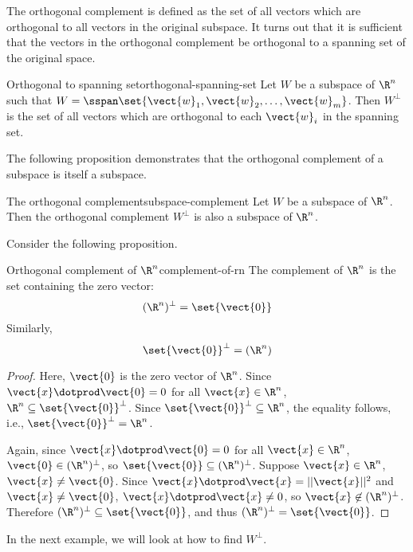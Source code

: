 The orthogonal complement is defined as the set of all vectors which are orthogonal to all vectors in the original subspace. It turns out that it is sufficient that the vectors in the orthogonal complement be orthogonal to a spanning set of the original space.

\begin{proposition}{Orthogonal to spanning set}{orthogonal-spanning-set}
Let $W$ be a subspace of $\R^n$ such that $W = \sspan \set{\vect{w}_1, \vect{w}_2,\ldots, \vect{w}_m }$. Then $W^{\perp}$ is the set of all vectors which are orthogonal to each $\vect{w}_i$ in the spanning set. 
\end{proposition}

The following proposition demonstrates that the orthogonal complement of a subspace is itself a subspace. 

\begin{proposition}{The orthogonal complement}{subspace-complement}
Let $W$ be a subspace of $\R^n$. Then the orthogonal complement $W^{\perp}$ is also a subspace of $\R^n$.
\end{proposition}

Consider the following proposition.

\begin{proposition}{Orthogonal complement of $\R^n$}{complement-of-rn}
The complement of $\R^n$ is the set containing the zero vector:
\[
 (\R^n)^{\perp} = \set{\vect{0} }
\]
Similarly, 
\[
\set{\vect{0} }^{\perp} = (\R^n)
\]
\end{proposition}

\begin{proof}
Here, $\vect{0}$ is the zero vector of $\R^n$.
Since $\vect{x}\dotprod\vect{0}=0$ for all $\vect{x}\in\R^n$, 
$\R^n\subseteq\set{\vect{0}}^{\perp}$.
Since $\set{\vect{0}}^{\perp}\subseteq\R^n$, the equality follows,
i.e., $\set{\vect{0}}^{\perp}=\R^n$.

Again, since $\vect{x}\dotprod\vect{0}=0$ for all $\vect{x}\in\R^n$,
$\vect{0}\in (\R^n)^{\perp}$, so $\set{\vect{0}}\subseteq(\R^n)^{\perp}$.
Suppose $\vect{x}\in\R^n$, $\vect{x}\neq\vect{0}$.  
Since $\vect{x}\dotprod\vect{x}=||\vect{x}||^2$ and $\vect{x}\neq\vect{0}$,
$\vect{x}\dotprod\vect{x}\neq 0$, so $\vect{x}\not\in(\R^n)^{\perp}$.
Therefore $(\R^n)^{\perp}\subseteq \set{\vect{0}}$, and thus
$(\R^n)^{\perp}=\set{\vect{0}}$.
\end{proof}

In the next example, we will look at how to find
$W^{\perp}$.

